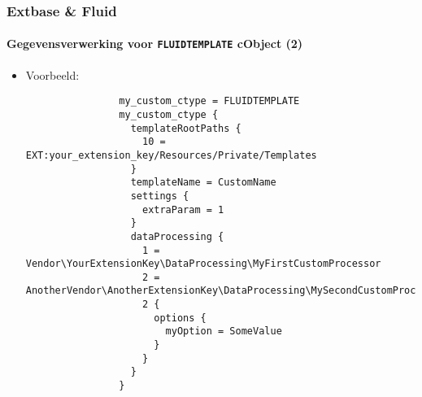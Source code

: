 \begin{frame}[fragile]
	\frametitle{Extbase \& Fluid}
	\framesubtitle{Gegevensverwerking voor \texttt{FLUIDTEMPLATE} cObject (2)}

	\lstset{basicstyle=\tiny\ttfamily}

	\begin{itemize}

		\item Voorbeeld:

			\begin{lstlisting}
				my_custom_ctype = FLUIDTEMPLATE
				my_custom_ctype {
				  templateRootPaths {
				    10 = EXT:your_extension_key/Resources/Private/Templates
				  }
				  templateName = CustomName
				  settings {
				    extraParam = 1
				  }
				  dataProcessing {
				    1 = Vendor\YourExtensionKey\DataProcessing\MyFirstCustomProcessor
				    2 = AnotherVendor\AnotherExtensionKey\DataProcessing\MySecondCustomProcessor
				    2 {
				      options {
				        myOption = SomeValue
				      }
				    }
				  }
				}
			\end{lstlisting}

	\end{itemize}

\end{frame}

